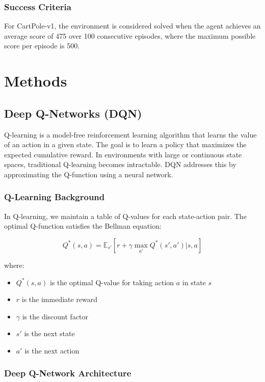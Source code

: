 \documentclass[11pt,a4paper]{article}
\begin{document}
\subsubsection{Success Criteria}
For CartPole-v1, the environment is considered solved when the agent achieves an average score of 475 over 100 consecutive episodes, where the maximum possible score per episode is 500.

\section{Methods}

\subsection{Deep Q-Networks (DQN)}

Q-learning is a model-free reinforcement learning algorithm that learns the value of an action in a given state. The goal is to learn a policy that maximizes the expected cumulative reward. In environments with large or continuous state spaces, traditional Q-learning becomes intractable. DQN addresses this by approximating the Q-function using a neural network.

\subsubsection{Q-Learning Background}

In Q-learning, we maintain a table of Q-values for each state-action pair. The optimal Q-function satisfies the Bellman equation:

\begin{equation}
    Q^*(s,a) = \mathbb{E}_{s'} \left[ r + \gamma \max_{a'} Q^*(s',a') | s, a \right]
\end{equation}

where:
\begin{itemize}
    \item $Q^*(s,a)$ is the optimal Q-value for taking action $a$ in state $s$
    \item $r$ is the immediate reward
    \item $\gamma$ is the discount factor
    \item $s'$ is the next state
    \item $a'$ is the next action
\end{itemize}

\subsubsection{Deep Q-Network Architecture}
\end{document}
